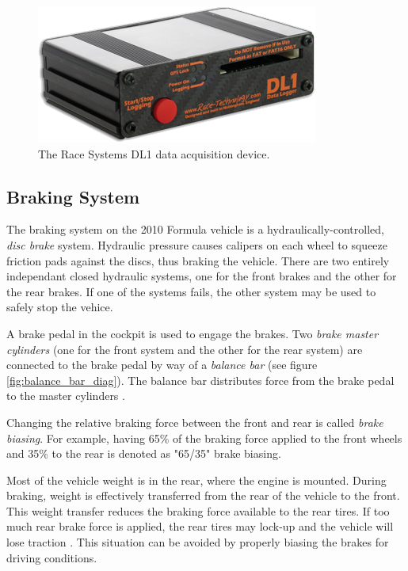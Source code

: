 \begin{figure}[H]
	\centering
	 	\includegraphics[scale=0.5]{figures/dl1.png}
    \caption{The Race Systems DL1 data acquisition device.}
    \label{fig:dl1_product}
\end{figure}

\subsection{Braking System}

The braking system on the 2010 Formula vehicle is a hydraulically-controlled, \emph{disc brake} 
system. Hydraulic pressure causes calipers on each wheel to squeeze friction pads against the 
discs, thus braking the vehicle. There are two entirely independant closed hydraulic systems, one 
for the front brakes and the other for the rear brakes. If one of the systems fails, the other 
system may be used to safely stop the vehice.

A brake pedal in the cockpit is used to engage the brakes. Two \emph{brake master cylinders}
(one for the front system and the other for the rear system) are connected to the brake pedal by 
way of a \emph{balance bar} (see figure \ref{fig:balance_bar_diag}). The balance bar distributes 
force from the brake pedal to the master cylinders \cite{TiltonBrakeBias}. 

Changing the relative braking force between the front and rear is called \emph{brake biasing}. 
For example, having 65\% of the braking force applied to the front wheels and 35\% to the rear is 
denoted as "65/35" brake biasing. 

Most of the vehicle weight is in the rear, where the engine is mounted. During braking, weight is 
effectively transferred from the rear of the vehicle to the front. This weight transfer reduces the 
braking force available to the rear tires. If too much rear brake force is applied, the rear tires 
may lock-up and the vehicle will lose traction \cite{FundVehicleDynamics}. This situation can be avoided
by properly biasing the brakes for driving conditions.


